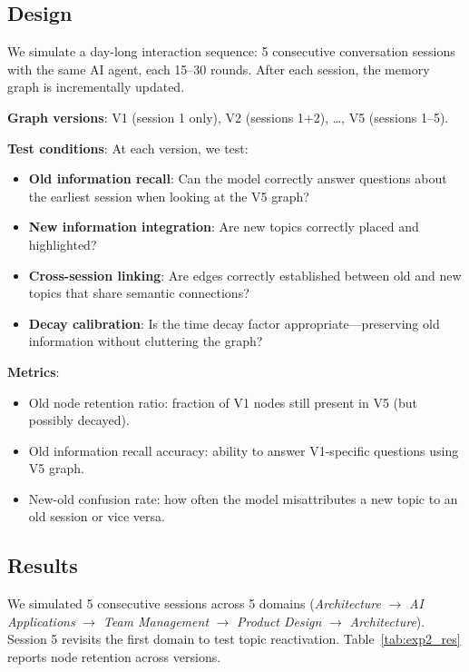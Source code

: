 \documentclass[11pt,a4paper]{article}
\begin{document}
\subsection{Design}

We simulate a day-long interaction sequence: 5 consecutive conversation sessions with the same AI agent, each 15--30 rounds. After each session, the memory graph is incrementally updated.

\textbf{Graph versions}: V1 (session 1 only), V2 (sessions 1+2), \ldots, V5 (sessions 1--5).

\textbf{Test conditions}: At each version, we test:
\begin{itemize}[nosep]
\item \textbf{Old information recall}: Can the model correctly answer questions about the earliest session when looking at the V5 graph?
\item \textbf{New information integration}: Are new topics correctly placed and highlighted?
\item \textbf{Cross-session linking}: Are edges correctly established between old and new topics that share semantic connections?
\item \textbf{Decay calibration}: Is the time decay factor appropriate---preserving old information without cluttering the graph?
\end{itemize}

\textbf{Metrics}:
\begin{itemize}[nosep]
\item Old node retention ratio: fraction of V1 nodes still present in V5 (but possibly decayed).
\item Old information recall accuracy: ability to answer V1-specific questions using V5 graph.
\item New-old confusion rate: how often the model misattributes a new topic to an old session or vice versa.
\end{itemize}

\subsection{Results}

We simulated 5 consecutive sessions across 5 domains (\textit{Architecture} $\rightarrow$ \textit{AI Applications} $\rightarrow$ \textit{Team Management} $\rightarrow$ \textit{Product Design} $\rightarrow$ \textit{Architecture}). Session 5 revisits the first domain to test topic reactivation. Table~\ref{tab:exp2_res} reports node retention across versions.
\end{document}
